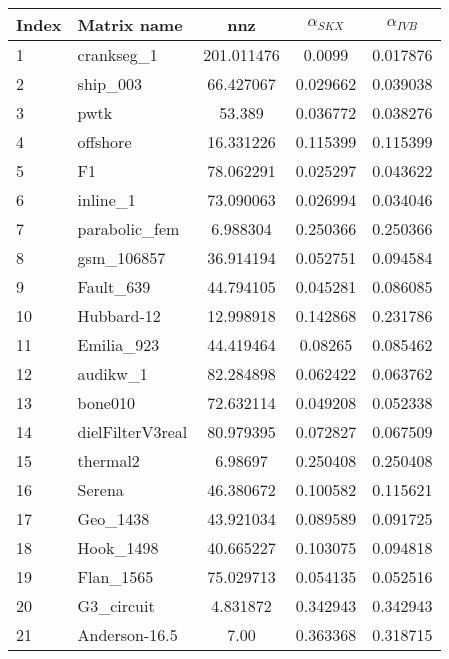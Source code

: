 \begin{tabular}{|l|l|S[round-mode=places,round-precision=2]|S[round-mode=places,round-precision=4]|S[round-mode=places,round-precision=4]|}
\toprule
{Index} & {Matrix name} &  {nnz} & {$\alpha_{SKX}$} & {$\alpha_{IVB}$}  \\
\midrule
{1}& {	crankseg\_1                }	& 201.011476	& 0.0099	& 0.017876	\\
{2}& {	ship\_003                  }	& 66.427067	& 0.029662	& 0.039038	\\
{3}& {	pwtk                      }	& 53.389	& 0.036772	& 0.038276	\\
{4}& {	offshore                  }	& 16.331226	& 0.115399	& 0.115399	\\
{5}& {	F1                        }	& 78.062291	& 0.025297	& 0.043622	\\
{6}& {	inline\_1                  }	& 73.090063	& 0.026994	& 0.034046	\\
{7}& {	parabolic\_fem             }	& 6.988304	& 0.250366	& 0.250366	\\
{8}& {	gsm\_106857                }	& 36.914194	& 0.052751	& 0.094584	\\
{9}& {	Fault\_639                 }	& 44.794105	& 0.045281	& 0.086085	\\
{10}& {	Hubbard-12                }	& 12.998918	& 0.142868	& 0.231786	\\
{11}& {	Emilia\_923                }	& 44.419464	& 0.08265	& 0.085462	\\
{12}& {	audikw\_1                  }	& 82.284898	& 0.062422	& 0.063762	\\
{13}& {	bone010                   }	& 72.632114	& 0.049208	& 0.052338	\\
{14}& {	dielFilterV3real          }	& 80.979395	& 0.072827	& 0.067509	\\
{15}& {	thermal2                  }	& 6.98697	& 0.250408	& 0.250408	\\
{16}& {	Serena                    }	& 46.380672	& 0.100582	& 0.115621	\\
{17}& {	Geo\_1438                  }	& 43.921034	& 0.089589	& 0.091725	\\
{18}& {	Hook\_1498                 }	& 40.665227	& 0.103075	& 0.094818	\\
{19}& {	Flan\_1565                 }	& 75.029713	& 0.054135	& 0.052516	\\
{20}& {	G3\_circuit                }	& 4.831872	& 0.342943	& 0.342943	\\
{21}& {	Anderson-16.5             }	& 7.00	& 0.363368	& 0.318715	\\

\end{tabular}
